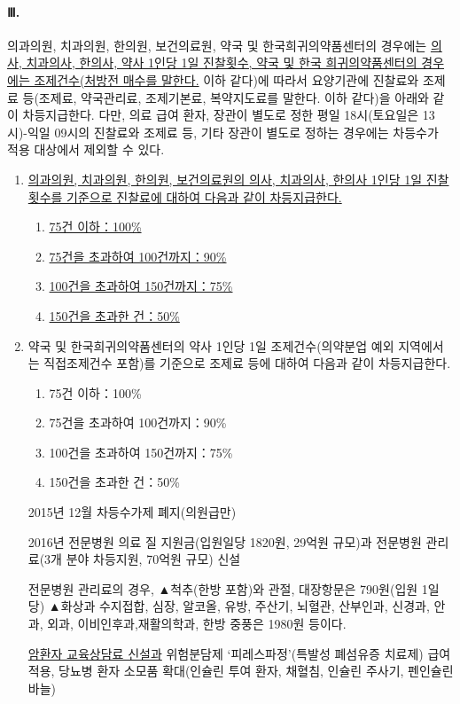 \paragraph{Ⅲ. }
의과의원, 치과의원, 한의원, 보건의료원, 약국 및 한국희귀의약품센터의 경우에는 \uline{의사, 치과의사, 한의사, 약사 1인당 1일 진찰횟수, 약국 및 한국 희귀의약품센터의 경우에는 조제건수(처방전 매수를 말한다.} 이하 같다)에 따라서 요양기관에 진찰료와 조제료 등(조제료, 약국관리료, 조제기본료, 복약지도료를 말한다. 이하 같다)을 아래와 같이 차등지급한다. 다만, 의료 급여 환자, 장관이 별도로 정한 평일 18시(토요일은 13시)-익일 09시의 진찰료와 조제료 등, 기타 장관이 별도로 정하는 경우에는 차등수가 적용 대상에서 제외할 수 있다.\par
\begin{enumerate}[가.]\tightlist
\item \uline{의과의원, 치과의원, 한의원, 보건의료원의 의사, 치과의사, 한의사 1인당 1일 진찰횟수를 기준으로 진찰료에 대하여 다음과 같이 차등지급한다.}
	\begin{enumerate}[(1)]
	\item \uline{75건 이하：100\%}
	\item \uline{75건을 초과하여 100건까지：90\%}
	\item \uline{100건을 초과하여 150건까지：75\%}
	\item \uline{150건을 초과한 건：50\%}
	\end{enumerate}
\item 약국 및 한국희귀의약품센터의 약사 1인당 1일 조제건수(의약분업 예외 지역에서는 직접조제건수 포함)를 기준으로 조제료 등에 대하여 다음과 같이 차등지급한다.
	\begin{enumerate}[(1)]
	\item 75건 이하：100\%
	\item 75건을 초과하여 100건까지：90\%
	\item 100건을 초과하여 150건까지：75\%
	\item 150건을 초과한 건：50\%
	\end{enumerate}
\begin{mdframed}[linecolor=blue,middlelinewidth=2]
\Large{2015년 12월 차등수가제 폐지(의원급만)}\par
\bigskip

\Large{2016년 전문병원 의료 질 지원금(입원일당 1820원, 29억원 규모)과 전문병원 관리료(3개 분야 차등지원, 70억원 규모) 신설}\par
전문병원 관리료의 경우, ▲척추(한방 포함)와 관절, 대장항문은 790원(입원 1일당) ▲화상과 수지접합, 심장, 알코올, 유방, 주산기, 뇌혈관, 산부인과, 신경과, 안과, 외과, 이비인후과,재활의학과, 한방 중풍은 1980원 등이다.\par
\uline{암환자 교육상담료 신설과} 위험분담제 `피레스파정'(특발성 폐섬유증 치료제) 급여 적용, 당뇨병 환자 소모품 확대(인슐린 투여 환자, 채혈침, 인슐린 주사기, 펜인슐린바늘)
\end{mdframed}


\end{enumerate}
